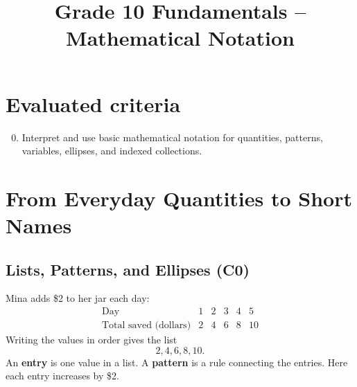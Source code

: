 \makeatletter
{}
\makeatother






\title{Grade 10 Fundamentals -- Mathematical Notation}
\author{}
\date{}


	\maketitle
	
	\setcounter{tocdepth}{1}
	\setcounter{secnumdepth}{2}
	\label{toc}
	\tableofcontents
	
	\section*{Evaluated criteria}
	\begin{enumerate}[label=\textbf{C\arabic*}]
		\setcounter{enumi}{-1}
		\item Interpret and use basic mathematical notation for quantities, patterns, variables, ellipses, and indexed collections.
	\end{enumerate}
	
	\section{From Everyday Quantities to Short Names}
	\label{sec:everyday-to-short-names}
	
	
	\subsection{Lists, Patterns, and Ellipses (C0)}
	\label{sec:lists-c0}
	\label{sec:ellipses-c0}
	
	Mina adds \$2 to her jar each day:
	\[
	\begin{array}{c|ccccc}
		\text{Day} & 1 & 2 & 3 & 4 & 5 \\
		\hline
		\text{Total saved (dollars)} & 2 & 4 & 6 & 8 & 10
	\end{array}
	\]
	Writing the values in order gives the list
	\[
	2,4,6,8,10.
	\]
	An \textbf{entry} is one value in a list. A \textbf{pattern} is a rule connecting the entries. Here each entry increases by \$2.
	
